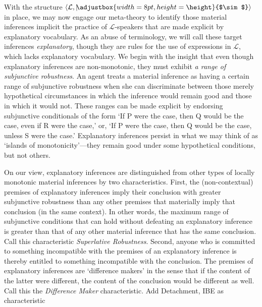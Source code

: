 \documentclass{article}
\newcommand{\ssim}{%
     \setbox0=\hbox{$\sim$}%
     \adjustbox{width=8pt,height=\height}{$\sim$}
}
\newcommand{\nmc}{\mathbin{\mid\joinrel\!\!\ssim}}
\begin{document}
With the structure $ \langle  \mathcal{L}, \nmc \rangle  $ in place, we may now engage our meta-theory to identify those material inferences implicit the practice of $ \mathcal{L} $-speakers that are made explicit by explanatory vocabulary. As an abuse of terminology, we will call these target inferences \textit{explanatory}, though they are rules for the use of expressions in $\mathcal{L} $, which lacks explanatory vocabulary. We begin with the insight that even though explanatory inferences are non-monotonic, they must exhibit \textit{a range of subjunctive robustness}. An agent treats a material inference as having a certain range of subjunctive robustness when she can discriminate between those merely hypothetical circumstances in which the inference would remain good and those in which it would not. These ranges can be made explicit by endorsing subjunctive conditionals of the form `If P were the case, then Q would be the case, even if R were the case,' or, `If P were the case, then Q would be the case, unless S were the case.' Explanatory inferences persist in what we may think of as `islands of monotonicity'---they remain good under some hypothetical conditions, but not others. 

On our view, explanatory inferences are distinguished from other types of locally monotonic material inferences by two characteristics. First, the (non-contextual) premises of explanatory inferences imply their conclusion with greater subjunctive robustness than any other premises that materially imply that conclusion (in the same context). In other words, the maximum range of subjunctive conditions that can hold without defeating an explanatory inference is greater than that of any other material inference that has the same conclusion. Call this characteristic \textit{Superlative Robustness}. \color{red}Second, anyone who is committed to something incompatible with the premises of an explanatory inference is thereby entitled to something incompatible with the conclusion. The premises of explanatory inferences are `difference makers' in the sense that if the content of the latter were different, the content of the conclusion would be different as well.  Call this the \textit{Difference Maker} characteristic. Add Detachment, IBE as characteristic \color{black}
\end{document}
